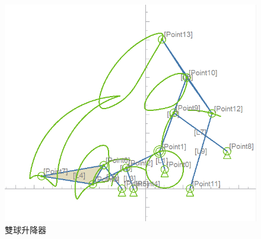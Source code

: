 \documentclass[14pt,a4paper]{report}  %
\begin{document}
{    \begin{figure}[H]
        \centering
        \includegraphics[scale=0.6]{雙球升降器.png} 
        \caption{雙球升降器} %
        \label{fig_Double Ball Lifter:scale} %
    \end{figure}
    
}
\end{document}
